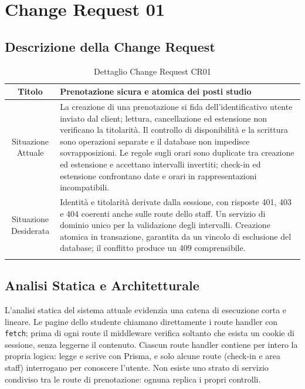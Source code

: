 \documentclass[11pt,a4paper,oneside,openany]{book}
\begin{document}
\chapter{Change Request 01}

\section{Descrizione della Change Request}

{\small
\begin{xltabular}{\linewidth}{SY}
  \toprule
  Titolo & Prenotazione sicura e atomica dei posti studio \\
  \midrule
  Situazione Attuale &
  La creazione di una prenotazione si fida dell'identificativo utente inviato
  dal client; lettura, cancellazione ed estensione non verificano la
  titolarità. Il controllo di disponibilità e la scrittura sono operazioni
  separate e il database non impedisce sovrapposizioni. Le regole sugli orari
  sono duplicate tra creazione ed estensione e accettano intervalli invertiti;
  check-in ed estensione confrontano date e orari in rappresentazioni
  incompatibili. \\
  \midrule
  Situazione Desiderata &
  Identità e titolarità derivate dalla sessione, con risposte 401, 403 e 404
  coerenti anche sulle route dello staff. Un servizio di dominio unico per la
  validazione degli intervalli. Creazione atomica in transazione, garantita da
  un vincolo di esclusione del database; il conflitto produce un 409
  comprensibile. \\
  \bottomrule
  \caption{Dettaglio Change Request CR01}\label{tab:cr01}\\
\end{xltabular}}

\section{Analisi Statica e Architetturale}

L'analisi statica del sistema attuale evidenzia una catena di esecuzione corta
e lineare. Le pagine dello studente chiamano direttamente i route handler con
\texttt{fetch}; prima di ogni route il middleware verifica soltanto che esista
un cookie di sessione, senza leggerne il contenuto. Ciascun route handler
contiene per intero la propria logica: legge e scrive con Prisma, e solo alcune
route (check-in e area staff) interrogano  per conoscere
l'utente. Non esiste uno strato di servizio condiviso tra le route di
prenotazione: ognuna replica i propri controlli.
\end{document}
